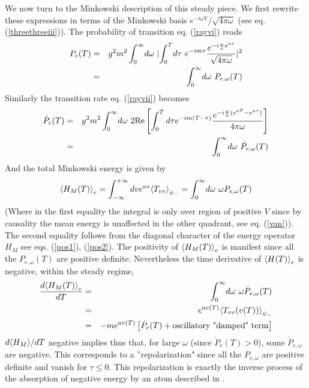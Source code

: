 We now turn to the Minkowski description of this steady piece.
We first rewrite these expressions in terms of the Minkowski
basis $e^{-i\omega V}/\sqrt{4 \pi \omega}$ (see eq. (\ref{threethreeiii})). The
probability of
transition eq. (\ref{rayvi})
reads
 \begin{eqnarray} P_{e}(T) &=&
g^2 m^2 \int_0^\infty\! d\omega \ \vert\! \int_0^T\! d\tau\ e^{-im\tau} {
e^{-i{\omega \over a} e^{a \tau}} \over \sqrt{4 \pi \omega}} \vert^2
\nonumber\\ &=& \int_0^\infty\! d \omega\ P_{e,\omega}(T)
\label{rayix}
\end{eqnarray}
Similarly the transition rate eq. (\ref{rayvii}) becomes
\begin{eqnarray} \dot P_{e}(T)
 &=& g^2
m^2 \int_0^\infty\! d\omega \ 2 \mbox{Re} \left[ \int_0^T d\tau e^{-im(T-\tau)}
{ e^{-i{\omega \over a} (e^{aT} - e^{a \tau})} \over 4 \pi \omega} \right]
\nonumber\\ &=& \int_0^\infty \! d\omega\  \dot P_{e,\omega}(T)
\label{rayx}
\end{eqnarray}
And the total Minkowski energy is given by
 \begin{eqnarray}
\mbox{$ \langle H_M(T) \rangle $}_{e} =
\int_{-\infty}^{+\infty} dv e^{av} \mbox{$ \langle T_{vv} \rangle $}_{\psi_-}
= \int_0^\infty\! d\omega\ \omega P_{e, \omega}(T)
\label{rayxi}
\end{eqnarray}
(Where in the first equality the integral is only over region of positive $V$
since by causality the mean energy is unaffected in the other quadrant,
see eq. (\ref{van})).
The
second equality follows from the diagonal character of the energy operator
$H_M$
see eqs. (\ref{pos1}), (\ref{pos2}).
The positivity of
$\mbox{$ \langle H_M(T) \rangle $}_{e}$
is manifest since
all the $P_{e,\omega}(T)$
are
positive definite. Nevertheless the time derivative of $\mbox{$ \langle H(T) \rangle $}_{e}$
is negative, within the steady regime,
\begin{eqnarray}
{d\mbox{$ \langle H_M(T) \rangle $}_{e} \over dT} &=& \int_0^\infty\! d\omega\ \omega
\dot P_{e,\omega}(T)\nonumber\\ &=& e^{a v(T)} \mbox{$ \langle T_{vv}(v(T)) \rangle $}_{\psi_-}
\nonumber\\
&=& -m e^{av(T)}  \left[ \dot P_{e} (T) + \hbox{oscillatory "damped" term}
 \right]
\label{rayxii}
\end{eqnarray}
${d\mbox{$ \langle H_M \rangle $} / dT}$
negative implies thus that,
for large $ \omega$ (since $ \dot P_e(T) >0$), some $\dot P_{e,\omega}$
are negative. This
corresponds to a ''repolarization" since all the $P_{e,\omega}$
are positive definite
and vanish for $\tau \leq 0$. This repolarization is
exactly the inverse process of the absorption of negative energy by an atom
described in \cite{Grove2}.


